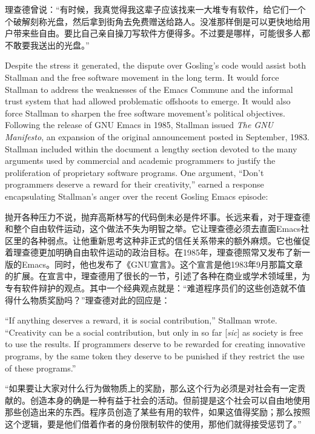 \ifdefined\chs
理查德曾说：“有时候，我真觉得我这辈子应该找来一大堆专有软件，给它们一个个破解刻称光盘，然后拿到街角去免费赠送给路人。没准那样倒是可以更快地给用户带来些自由。要比自己亲自操刀写软件方便得多。不过要是哪样，可能很多人都不敢要我送出的光盘。”
\fi

\ifdefined\eng
Despite the stress it generated, the dispute over Gosling's code would assist both Stallman and the free software movement in the long term. It would force Stallman to address the weaknesses of the Emacs Commune and the informal trust system that had allowed problematic offshoots to emerge. It would also force Stallman to sharpen the free software movement's political objectives. Following the release of GNU Emacs in 1985, Stallman issued \textit{The GNU Manifesto}, an expansion of the original announcement posted in September, 1983. Stallman included within the document a lengthy section devoted to the many arguments used by commercial and academic programmers to justify the proliferation of proprietary software programs. One argument, ``Don't programmers deserve a reward for their creativity,'' earned a response encapsulating Stallman's anger over the recent Gosling Emacs episode:
\fi

\ifdefined\chs
抛开各种压力不说，抛弃高斯林写的代码倒未必是件坏事。长远来看，对于理查德和整个自由软件运动，这个做法不失为明智之举。它让理查德必须去直面Emacs社区里的各种弱点。让他重新思考这种非正式的信任关系带来的额外麻烦。它也催促着理查德更加明确自由软件运动的政治目标。在1985年，理查德照常又发布了新一版的Emacs。同时，他也发布了《GNU宣言》。这个宣言是他1983年9月那篇文章的扩展。在宣言中，理查德用了很长的一节，引述了各种在商业或学术领域里，为专有软件辩护的观点。其中一个经典观点就是：“难道程序员们的这些创造就不值得什么物质奖励吗？”理查德对此的回应是：
\fi

\ifdefined\eng
``If anything deserves a reward, it is social contribution,'' Stallman wrote. ``Creativity can be a social contribution, but only in so far [\textit{sic}] as society is free to use the results. If programmers deserve to be rewarded for creating innovative programs, by the same token they deserve to be punished if they restrict the use of these programs.''
\fi

\ifdefined\chs
“如果要让大家对什么行为做物质上的奖励，那么这个行为必须是对社会有一定贡献的。创造本身的确是一种有益于社会的活动。但前提是这个社会可以自由地使用那些创造出来的东西。程序员创造了某些有用的软件，如果这值得奖励；那么按照这个逻辑，要是他们借着作者的身份限制软件的使用，那他们就得接受惩罚了。”
\fi

